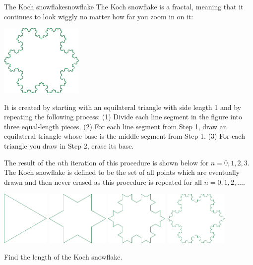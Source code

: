 \documentclass[prettycode,shellescape]{watsonbook}
\begin{document}
\begin{exercise}{The Koch snowflake}{snowflake}
  The Koch snowflake is a fractal, meaning that it continues to look
  wiggly no matter how far you zoom in on it:

  \begin{center} 
    \includegraphics[width=4cm]{figures/koch7.pdf}
  \end{center}
  
  It is created by starting with an equilateral triangle with
  side length 1 and by repeating the following process: (1) Divide
  each line segment in the figure into three equal-length
  pieces. (2) For each line segment from Step 1, draw an equilateral
  triangle whose base is the middle segment from Step 1. (3) For
  each triangle you draw in Step 2, erase its base.

  The result of the $n$th iteration of this procedure is shown below
  for $n=0,1,2,3$. The Koch snowflake is defined to be the set of
  all points which are eventually drawn and then never erased as
  this procedure is repeated for all $n=0,1,2,\ldots$.
  
  \begin{center} 
    \includegraphics[width=2.28cm]{figures/koch0.pdf} \:
    \includegraphics[width=3.04cm]{figures/koch1.pdf} \:
    \includegraphics[width=3.04cm]{figures/koch2.pdf} \:
    \includegraphics[width=3.04cm]{figures/koch3.pdf}
  \end{center}
  
  Find the length of the Koch snowflake. 
\end{exercise}
\end{document}
